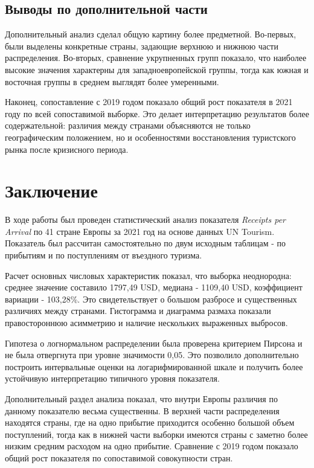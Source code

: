 \documentclass[14pt,a4paper]{extarticle}
\begin{document}
\subsection{Выводы по дополнительной части}

Дополнительный анализ сделал общую картину более предметной. Во-первых, были выделены конкретные страны, задающие верхнюю и нижнюю части распределения. Во-вторых, сравнение укрупненных групп показало, что наиболее высокие значения характерны для западноевропейской группы, тогда как южная и восточная группы в среднем выглядят более умеренными.

Наконец, сопоставление с 2019 годом показало общий рост показателя в 2021 году по всей сопоставимой выборке. Это делает интерпретацию результатов более содержательной: различия между странами объясняются не только географическим положением, но и особенностями восстановления туристского рынка после кризисного периода.

\section*{Заключение}

В ходе работы был проведен статистический анализ показателя \textit{Receipts per Arrival} по 41 стране Европы за 2021 год на основе данных UN Tourism. Показатель был рассчитан самостоятельно по двум исходным таблицам - по прибытиям и по поступлениям от въездного туризма.

Расчет основных числовых характеристик показал, что выборка неоднородна: среднее значение составило 1797,49 USD, медиана - 1109,40 USD, коэффициент вариации - 103,28\%. Это свидетельствует о большом разбросе и существенных различиях между странами. Гистограмма и диаграмма размаха показали правостороннюю асимметрию и наличие нескольких выраженных выбросов.

Гипотеза о логнормальном распределении была проверена критерием Пирсона и не была отвергнута при уровне значимости 0,05. Это позволило дополнительно построить интервальные оценки на логарифмированной шкале и получить более устойчивую интерпретацию типичного уровня показателя.

Дополнительный раздел анализа показал, что внутри Европы различия по данному показателю весьма существенны. В верхней части распределения находятся страны, где на одно прибытие приходится особенно большой объем поступлений, тогда как в нижней части выборки имеются страны с заметно более низким средним расходом на одно прибытие. Сравнение с 2019 годом показало общий рост показателя по сопоставимой совокупности стран.
\end{document}
